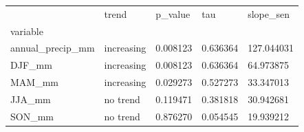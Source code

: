 \begin{tabular}{lllll}
\toprule
 & trend & p\_value & tau & slope\_sen \\
variable &  &  &  &  \\
\midrule
annual\_precip\_mm & increasing & 0.008123 & 0.636364 & 127.044031 \\
DJF\_mm & increasing & 0.008123 & 0.636364 & 64.973875 \\
MAM\_mm & increasing & 0.029273 & 0.527273 & 33.347013 \\
JJA\_mm & no trend & 0.119471 & 0.381818 & 30.942681 \\
SON\_mm & no trend & 0.876270 & 0.054545 & 19.939212 \\
\bottomrule
\end{tabular}
